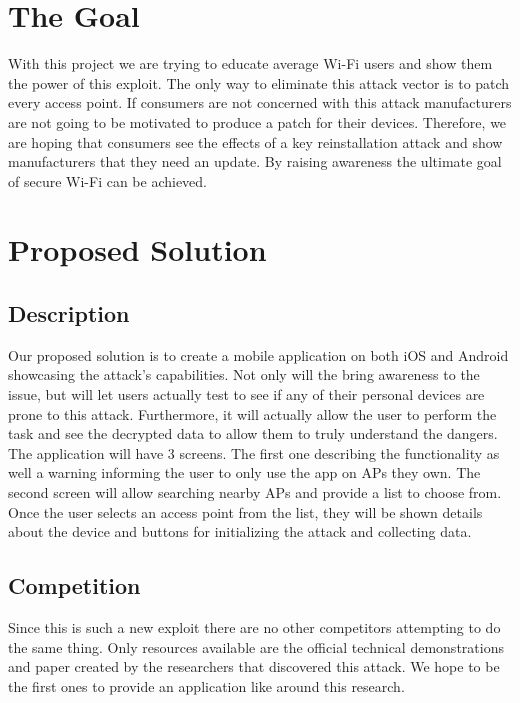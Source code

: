 \documentclass[11pt,]{article}
\begin{document}
\section{The Goal}\label{the-goal}

With this project we are trying to educate average Wi-Fi users and show
them the power of this exploit. The only way to eliminate this attack
vector is to patch every access point. If consumers are not concerned
with this attack manufacturers are not going to be motivated to produce
a patch for their devices. Therefore, we are hoping that consumers see
the effects of a key reinstallation attack and show manufacturers that
they need an update. By raising awareness the ultimate goal of secure
Wi-Fi can be achieved.

\section{Proposed Solution}\label{proposed-solution}

\subsection{Description}\label{description}

Our proposed solution is to create a mobile application on both iOS and
Android showcasing the attack's capabilities. Not only will the bring
awareness to the issue, but will let users actually test to see if any
of their personal devices are prone to this attack. Furthermore, it will
actually allow the user to perform the task and see the decrypted data
to allow them to truly understand the dangers. The application will have
3 screens. The first one describing the functionality as well a warning
informing the user to only use the app on APs they own. The second
screen will allow searching nearby APs and provide a list to choose
from. Once the user selects an access point from the list, they will be
shown details about the device and buttons for initializing the attack
and collecting data.

\subsection{Competition}\label{competition}

Since this is such a new exploit there are no other competitors
attempting to do the same thing. Only resources available are the
official technical demonstrations and paper created by the researchers
that discovered this attack. We hope to be the first ones to provide an
application like around this research.
\end{document}
